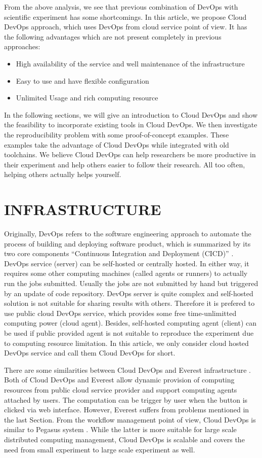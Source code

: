 \documentclass{IEEEcsmag}
\begin{document}
From the above analysis, we see that previous combination of DevOps with scientific experiment has some shortcomings. In this article, we propose Cloud DevOps approach, which uses DevOps from cloud service point of view. It has the following advantages which are not present completely in previous approaches:
\begin{itemize}
	\item High availability of the service and well maintenance of the infrastructure
	\item Easy to use and have flexible configuration
	\item Unlimited Usage and rich computing resource
\end{itemize}
 In the following sections, we will give an introduction to Cloud DevOps and show the feasibility to incorporate existing tools in Cloud DevOps. We then investigate the reproducibility problem with some proof-of-concept examples. These examples take the advantage of Cloud DevOps while integrated with old toolchains. We believe Cloud DevOps can help researchers be more productive in their experiment and help others easier to follow their research. All too often, helping others actually helps yourself.

\section{INFRASTRUCTURE}
Originally, DevOps refers to the software engineering approach to automate the process of building and deploying software product, which is summarized by its two core components ``Continuous Integration and Deployment (CICD)'' \cite{bass2015devops}. 
DevOps service (server) can be self-hosted or centrally hosted. In either way, it requires some other computing machines (called agents or runners) to actually run the jobs submitted. Usually the jobs are not submitted by hand but triggered by an update of code repository. 
DevOps server is quite complex and self-hosted solution is not suitable for sharing results with others. Therefore it is prefered to use public cloud DevOps service, which provides some free time-unlimitted computing power (cloud agent). Besides, self-hosted computing agent (client) can be used if public provided agent is not suitable to reproduce the experiment due to computing resource limitation. In this article, we only consider cloud hosted DevOps service and call them Cloud DevOps for short.

There are some similarities between Cloud DevOps and Everest infrastructure \cite{GavishD12} . Both of Cloud DevOps and Everest allow dynamic provision of computing resources from public cloud service provider and support computing agents attached by users. The computation can be trigger by user when the button is clicked via web interface.
However, Everest suffers from problems mentioned in the last Section. From the workflow management point of view, Cloud DevOps is similar to Pegasus system \cite{Pegasus}. While the latter is more suitable for large scale distributed computing management, Cloud DevOps is scalable and covers the need from small experiment to large scale experiment as well.
\end{document}
